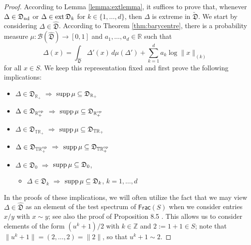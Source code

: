 \documentclass[12pt,a4paper,reqno]{amsart}
\theoremstyle{definition}
\newcommand{\mc}[1]{\mathcal{#1}}
\newcommand{\ms}[1]{\mathsf{#1}}
\newcommand{\mf}[1]{\mathfrak{#1}}
\newcommand{\R}{\mathbb R}
\newcommand{\Z}{\mathbb Z}
\newcommand{\T}{\mathbb T}
\begin{document}
\begin{proof}
According to Lemma \ref{lemma:extlemma}, it suffices to prove that, whenever $\Delta\in\mf D_{\rm nd}$ or $\Delta\in{\rm ext}\,\mf D_k$ for $k\in\{1,\ldots,d\}$, then $\Delta$ is extreme in $\tilde{\mf D}$. We start by considering $\Delta\in\hat{\mf D}$. According to Theorem \ref{thm:barycentre}, there is a probability measure $\mu:\mc B(\hat{\mf D})\to[0,1]$ and $a_1,\ldots,a_d\in\R$ such that
\begin{equation}\label{eq:barycentreDelta}
\Delta(x)=\int_{\hat{\mf D}}\Delta'(x)\,d\mu(\Delta')+\sum_{k=1}^d a_k\log{\|x\|_{(k)}}
\end{equation}
for all $x\in S$. We keep this representation fixed and first prove the following implications:
\begin{itemize}
\item[(i)] $\Delta\in\mf D_{\R_+}$ $\Rightarrow$ ${\rm supp}\,\mu\subseteq\mf D_{\R_+}$
\item[(ii)] $\Delta\in\mf D_{\R_+^{\rm op}}$ $\Rightarrow$ ${\rm supp}\,\mu\subseteq\mf D_{\R_+^{\rm op}}$
\item[(iii)] $\Delta\in\mf D_{\T\R_+}$ $\Rightarrow$ ${\rm supp}\,\mu\subseteq\mf D_{\T\R_+}$
\item[(iv)] $\Delta\in\mf D_{\T\R_+^{\rm op}}$ $\Rightarrow$ ${\rm supp}\,\mu\subseteq\mf D_{\T\R_+^{\rm op}}$
\item[(v)] $\Delta\in\mf D_0$ $\Rightarrow$ ${\rm supp}\,\mu\subseteq\mf D_0$,
\begin{itemize}
\item[(vk)] $\Delta\in\mf D_k$ $\Rightarrow$ ${\rm supp}\,\mu\subseteq\mf D_k$, $k=1,\ldots,d$
\end{itemize}
\end{itemize}
In the proofs of these implications, we will often utilize the fact that we may view $\Delta\in\hat{\mf D}$ as an element of the test spectrum of $\ms{Frac}(S)$ when we consider entries $x/y$ with $x\sim y$; see also the proof of Proposition 8.5 \cite{FritzII}. This allows us to consider elements of the form $(u^k+1)/2$ with $k\in\Z$ and $2:=1+1\in S$; note that $\|u^k+1\|=(2,\ldots,2)=\|2\|$, so that $u^k+1\sim 2$.


\end{proof}
\end{document}
